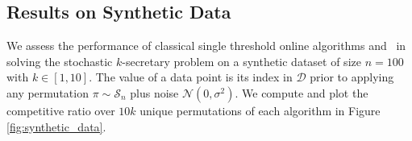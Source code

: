 


\subsection{Results on Synthetic Data}
We assess the performance of classical single threshold online algorithms and \algoname\ in solving the stochastic $k$-secretary problem on a synthetic dataset of size $n=100$ with $k \in [1,10]$. The value of a data point is its index in $\mathcal{D}$ prior to applying any permutation $\pi \sim \mathcal{S}_n$ plus noise $\mathcal{N}(0, \sigma^2)$. We compute and plot the competitive ratio over $10k$ unique permutations of each algorithm in Figure \ref{fig:synthetic_data}. 

